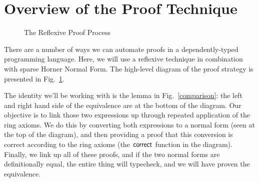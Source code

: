 \documentclass[acmsmall, screen, nonacm, timestamp, review]{acmart}
\theoremstyle{definition}
\theoremstyle{definition}
\begin{document}
\section{Overview of the Proof Technique}
\begin{figure}
  \vspace*{-50pt}
  \caption{The Reflexive Proof Process}
  \label{proof-process}
\end{figure}

There are a number of ways we can automate proofs in a dependently-typed
programming language. Here, we will use a reflexive technique
\cite{boutin_using_1997} in combination with sparse Horner Normal Form. The
high-level diagram of the proof strategy is presented in
Fig.~\ref{proof-process}.

The identity we'll be working with is the lemma in Fig.~\ref{comparison}: the
left and right hand side of the equivalence are at the bottom of the diagram. Our
objective is to link those two expressions up through repeated application of
the ring axioms. We do this by converting both expressions to a normal form
(seen at the top of the diagram), and then providing a proof that this
conversion is correct according to the ring axioms (the
\(\AgdaFunction{correct}\) function in the diagram). Finally, we link up all of
these proofs, and if the two normal forms are definitionally equal, the entire
thing will typecheck, and we will have proven the equivalence.
\end{document}
